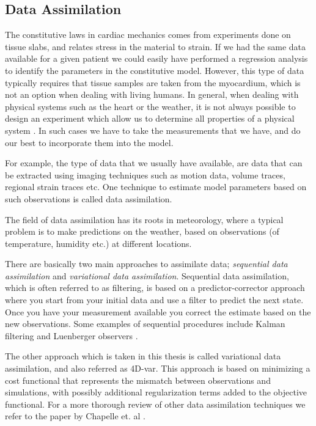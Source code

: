 \subsection{Data Assimilation}
The constitutive laws in cardiac mechanics comes from experiments
done on tissue slabs, and relates stress in the material to strain.
If we had the same data available for a given patient we could easily
have performed a regression analysis to identify the
parameters in the constitutive model. However, this type of data
typically requires that tissue samples are taken from the myocardium,
which is not an option when dealing with living humans. In general,
when dealing with physical systems such as the heart or the weather,
it is not always possible to design an experiment which
allow us to determine all properties of a physical system
\cite{chapelle2013fundamental}. In such cases we have to take the
measurements that we have, and do our best to incorporate them into the
model. 

For example, the type of data that we usually have available, are data
that can be extracted using imaging techniques such as motion data,
volume traces, regional strain traces etc. One technique to estimate
model parameters based on such observations is called data assimilation.


The field of data assimilation has its roots in meteorology, where
a typical problem is to make predictions on the weather, based on
observations (of temperature, humidity etc.) at different locations. 


There are basically two main approaches to assimilate data;
\emph{sequential data assimilation} and \emph{variational data
  assimilation}. Sequential data assimilation, which is often
referred to as filtering, is based on a predictor-corrector approach
where you start from your initial data and use a filter to predict the
next state. Once you have your measurement available you correct the
estimate based on the new observations. Some examples of sequential
procedures include Kalman filtering and Luenberger observers
\cite{chapelle2013fundamental}.

The other approach which is taken in this thesis is called variational
data assimilation, and also referred as 4D-var. This approach is based
on minimizing a cost functional that represents the mismatch between
observations and simulations, with possibly additional regularization
terms added to the objective functional.
For a more thorough review of other
data assimilation techniques we refer to the paper by Chapelle
et. al \cite{chapelle2013fundamental}.


